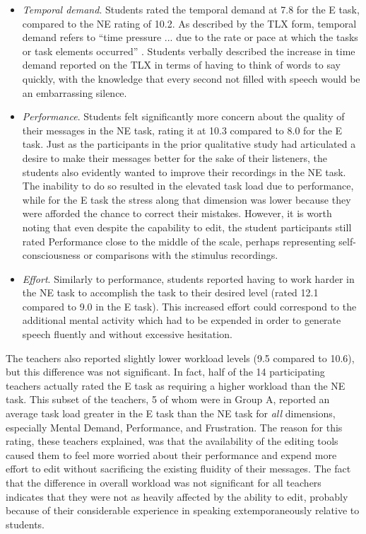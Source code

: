 \begin{itemize}
	\item \emph{Temporal demand}. Students rated the temporal demand at 7.8 for the E task, compared to the NE rating of 10.2. 
	As described by the TLX form, temporal demand refers to ``time pressure ... due to the rate or pace at which the tasks or task elements occurred'' \cite{nasatlx}.
	Students verbally described the increase in time demand reported on the TLX in terms of having to think of words to say quickly, with the knowledge that every second not filled with speech would be an embarrassing silence.
	\item \emph{Performance}. Students felt significantly more concern about the quality of their messages in the NE task, rating it at 10.3 compared to 8.0 for the E task. 
	Just as the participants in the prior qualitative study had articulated a desire to make their messages better for the sake of their listeners, the students also evidently wanted to improve their recordings in the NE task. 
	The inability to do so resulted in the elevated task load due to performance, while for the E task the stress along that dimension was lower because they were afforded the chance to correct their mistakes.
	However, it is worth noting that even despite the capability to edit, the student participants still rated Performance close to the middle of the scale, perhaps representing self-consciousness or comparisons with the stimulus recordings.
	\item \emph{Effort}. Similarly to performance, students reported having to work harder in the NE task to accomplish the task to their desired level (rated 12.1 compared to 9.0 in the E task). 
	This increased effort could correspond to the additional mental activity which had to be expended in order to generate speech fluently and without excessive hesitation.
\end{itemize}

The teachers also reported slightly lower workload levels (9.5 compared to 10.6), but this difference was not significant. 
In fact, half of the 14 participating teachers actually rated the E task as requiring a higher workload than the NE task.
This subset of the teachers, 5 of whom were in Group A, reported an average task load greater in the E task than the NE task for \emph{all} dimensions, especially Mental Demand, Performance, and Frustration.
The reason for this rating, these teachers explained, was that the availability of the editing tools caused them to feel more worried about their performance and expend more effort to edit without sacrificing the existing fluidity of their messages.
The fact that the difference in overall workload was not significant for all teachers indicates that they were not as heavily affected by the ability to edit, probably because of their considerable experience in speaking extemporaneously relative to students.

